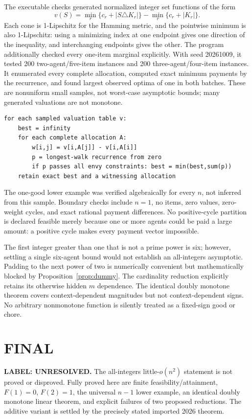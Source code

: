 \documentclass[11pt,a4paper]{article}
\theoremstyle{remark}\newtheorem{remark}[theorem]{Remark}
\begin{document}
The executable checks generated normalized integer set functions of the form
\[
v(S)=\min_r\{c_r+|S\triangle K_r|\}-\min_r\{c_r+|K_r|\}.
\]
Each cone is 1-Lipschitz for the Hamming metric, and the pointwise minimum is also 1-Lipschitz: using a minimizing index at one endpoint gives one direction of the inequality, and interchanging endpoints gives the other. The program additionally checked every one-item marginal explicitly. With seed 20261009, it tested 200 two-agent/five-item instances and 200 three-agent/four-item instances. It enumerated every complete allocation, computed exact minimum payments by the recurrence, and found largest observed optima of one in both batches. These are nonuniform small samples, not worst-case asymptotic bounds; many generated valuations are not monotone.
\begin{lstlisting}
for each sampled valuation table v:
    best = infinity
    for each complete allocation A:
        w[i,j] = v[i,A[j]] - v[i,A[i]]
        p = longest-walk recurrence from zero
        if p passes all envy constraints: best = min(best,sum(p))
    retain exact best and a witnessing allocation
\end{lstlisting}
The one-good lower example was verified algebraically for every $n$, not inferred from this sample. Boundary checks include $n=1$, no items, zero values, zero-weight cycles, and exact rational payment differences. No positive-cycle partition is declared feasible merely because one or more agents could be paid a large amount: a positive cycle makes every payment vector impossible.

The first integer greater than one that is not a prime power is six; however, settling a single six-agent bound would not establish an all-integers asymptotic. Padding to the next power of two is numerically convenient but mathematically blocked by Proposition~\ref{prop:dummy}. The cardinality reduction explicitly retains its otherwise hidden $m$ dependence. The identical doubly monotone theorem covers context-dependent magnitudes but not context-dependent signs. No arbitrary nonmonotone function is silently treated as a fixed-sign good or chore.

\section{FINAL}
\textbf{LABEL: UNRESOLVED.}
The all-integers little-$o(n^2)$ statement is not proved or disproved. Fully proved here are finite feasibility/attainment, $F(1)=0$, $F(2)=1$, the universal $n-1$ lower example, an identical doubly monotone linear theorem, and explicit failures of two proposed reductions. The additive variant is settled by the precisely stated imported 2026 theorem.
\end{document}
